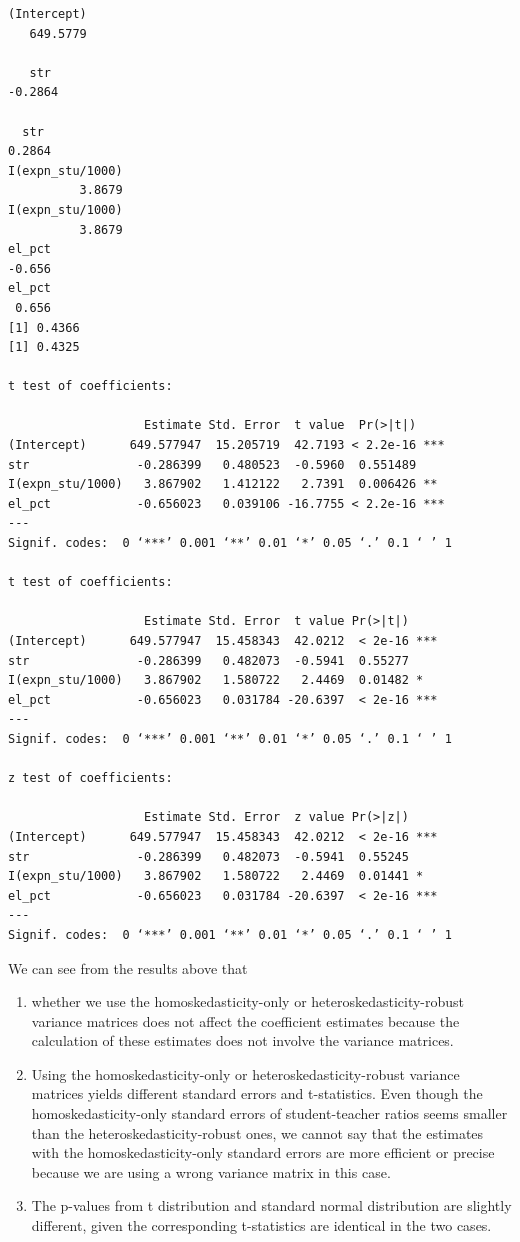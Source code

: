 \documentclass[a4paper,11pt]{article}
\begin{document}
\begin{verbatim}
(Intercept)
   649.5779

   str
-0.2864

  str
0.2864
I(expn_stu/1000)
          3.8679
I(expn_stu/1000)
          3.8679
el_pct
-0.656
el_pct
 0.656
[1] 0.4366
[1] 0.4325

t test of coefficients:

                   Estimate Std. Error  t value  Pr(>|t|)
(Intercept)      649.577947  15.205719  42.7193 < 2.2e-16 ***
str               -0.286399   0.480523  -0.5960  0.551489
I(expn_stu/1000)   3.867902   1.412122   2.7391  0.006426 **
el_pct            -0.656023   0.039106 -16.7755 < 2.2e-16 ***
---
Signif. codes:  0 ‘***’ 0.001 ‘**’ 0.01 ‘*’ 0.05 ‘.’ 0.1 ‘ ’ 1

t test of coefficients:

                   Estimate Std. Error  t value Pr(>|t|)
(Intercept)      649.577947  15.458343  42.0212  < 2e-16 ***
str               -0.286399   0.482073  -0.5941  0.55277
I(expn_stu/1000)   3.867902   1.580722   2.4469  0.01482 *
el_pct            -0.656023   0.031784 -20.6397  < 2e-16 ***
---
Signif. codes:  0 ‘***’ 0.001 ‘**’ 0.01 ‘*’ 0.05 ‘.’ 0.1 ‘ ’ 1

z test of coefficients:

                   Estimate Std. Error  z value Pr(>|z|)
(Intercept)      649.577947  15.458343  42.0212  < 2e-16 ***
str               -0.286399   0.482073  -0.5941  0.55245
I(expn_stu/1000)   3.867902   1.580722   2.4469  0.01441 *
el_pct            -0.656023   0.031784 -20.6397  < 2e-16 ***
---
Signif. codes:  0 ‘***’ 0.001 ‘**’ 0.01 ‘*’ 0.05 ‘.’ 0.1 ‘ ’ 1
\end{verbatim}

We can see from the results above that
\begin{enumerate}
\item whether we use the homoskedasticity-only or
heteroskedasticity-robust variance matrices does not affect the
coefficient estimates because the calculation of these estimates
does not involve the variance matrices.
\item Using the homoskedasticity-only or
heteroskedasticity-robust variance matrices yields different
standard errors and t-statistics. Even though the
homoskedasticity-only standard errors of student-teacher ratios
seems smaller than the heteroskedasticity-robust ones, we cannot
say that the estimates with the homoskedasticity-only standard
errors are more efficient or precise because we are using a wrong
variance matrix in this case.
\item The p-values from t distribution and standard normal distribution
are slightly different, given the corresponding t-statistics are
identical in the two cases.
\end{enumerate}
\end{document}
